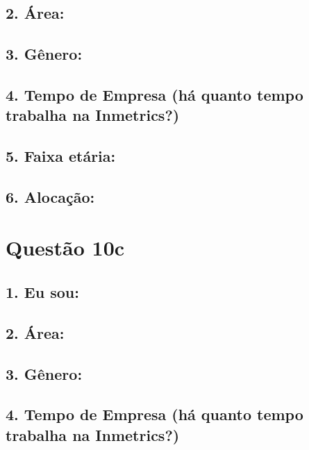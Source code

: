 \documentclass[]{book}
\begin{document}
\hypertarget{area-9}{%
\subsection{2. Área:}\label{area-9}}

\hypertarget{genero-9}{%
\subsection{3. Gênero:}\label{genero-9}}

\hypertarget{tempo-de-empresa-ha-quanto-tempo-trabalha-na-inmetrics-9}{%
\subsection{4. Tempo de Empresa (há quanto tempo trabalha na Inmetrics?)}\label{tempo-de-empresa-ha-quanto-tempo-trabalha-na-inmetrics-9}}

\hypertarget{faixa-etaria-9}{%
\subsection{5. Faixa etária:}\label{faixa-etaria-9}}

\hypertarget{alocacao-9}{%
\subsection{6. Alocação:}\label{alocacao-9}}

\hypertarget{questao-10c}{%
\section{Questão 10c}\label{questao-10c}}

\hypertarget{eu-sou-10}{%
\subsection{1. Eu sou:}\label{eu-sou-10}}

\hypertarget{area-10}{%
\subsection{2. Área:}\label{area-10}}

\hypertarget{genero-10}{%
\subsection{3. Gênero:}\label{genero-10}}

\hypertarget{tempo-de-empresa-ha-quanto-tempo-trabalha-na-inmetrics-10}{%
\subsection{4. Tempo de Empresa (há quanto tempo trabalha na Inmetrics?)}\label{tempo-de-empresa-ha-quanto-tempo-trabalha-na-inmetrics-10}}
\end{document}
